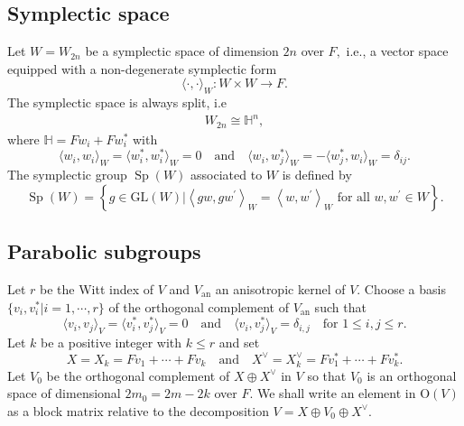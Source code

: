 \documentclass[article]{article}
\numberwithin{equation}{section}
\theoremstyle{definition}
\DeclareMathOperator{\SP}{Sp}
\begin{document}
	



\subsection{Symplectic space}\label{sympleticspace}
Let $W=W_{2 n}$ be a symplectic space of dimension $2n$ over $F,$ i.e., a vector space equipped with a non-degenerate symplectic form
$$\langle\cdot, \cdot\rangle_{W} : W \times W \rightarrow F.$$
The symplectic space is always split, i.e 
\begin{align}\label{128}
W_{2n}\cong \mathbb{H}^{n} ,
\end{align}
where $\mathbb{H}=F w_i+ Fw_{i}^{*}$ with $$\langle w_i,w_i\rangle_{W} =\langle w_{i}^{*},  w_{i}^{*}\rangle_{W}=0 \quad \mbox{and} \quad \langle w_i, w_{j}^{*}\rangle_{W}=-\langle w_{j}^{*}, w_{i}\rangle_{W}=\delta_{ij}.$$
The symplectic group  $\SP(W)$ associated to $W$ is defined by 
$$\operatorname{Sp}(W)=\left\{g \in \mathrm{GL}(W) |\left\langle g w, g w^{\prime}\right\rangle_{W}=\left\langle w, w^{\prime}\right\rangle_{W} \text { for all } w, w^{\prime} \in W\right\}.$$

\subsection{Parabolic subgroups}\label{sectionparabolic}
Let $r$ be the Witt index of $V$ and $V_{\mathrm{an}}$ an anisotropic kernel of $V$. Choose a basis $\{v_i,v_i^*|i=1,\cdots,r\}$ of the orthogonal complement of $V_{\mathrm{an}}$ such that  
$$
\langle v_i, v_j\rangle_V=\langle v_i^*, v_j^*\rangle_V=0 \quad \mbox{and}\quad \langle v_i, v_j^*\rangle_V=\delta_{i, j}\quad \mbox{for $1\leq i,j\leq r$}.
$$
Let $k$ be a positive integer with $k\leq r$ and set 
$$
X=X_k=Fv_1+\cdots+Fv_k \quad \mbox{and}\quad X^\vee=X_k^{\vee}=Fv_1^*+\cdots+Fv_k^*.
$$
Let $V_0$ be the orthogonal complement of $X \oplus X^{\vee}$ in $V$ so that $V_0$ is an orthogonal space of dimensional $2m_0=2m-2k$ over $F$. We shall write an element in $\mathrm{O}(V)$ as a block matrix relative to the decomposition $V=X\oplus V_0\oplus X^\vee$. 
\end{document}
